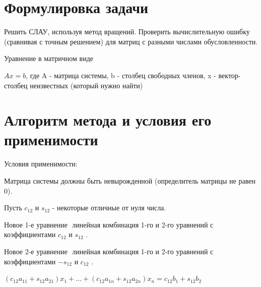 






\section{Формулировка задачи}

Решить СЛАУ, используя метод вращений. Проверить вычислительную ошибку (сравнивая с точным решением) для матриц с разными числами 
обусловленности.

Уравнение в матричном виде 

\begin{math}
	Ax=b
\end{math},
где A - матрица системы, b - столбец свободных членов, x - вектор-столбец неизвестных (который нужно найти)

\section{Алгоритм метода и условия его применимости}

Условия применимости: 

Матрица системы должны быть невырожденной (определитель матрицы не равен 0).


Пусть \begin{math}
	c_{12}
\end{math} и
 \begin{math}
 	s_{12}
 \end{math} - некоторые отличные от нуля числа.

Новое 1-­е уравнение ­ линейная комбинация 1-­го и 2-го уравнений с коэффициентами 
\begin{math}
	c_{12}
\end{math} и
\begin{math}
	s_{12}
\end{math}  .

Новое 2-­е уравнение ­ линейная комбинация 1-­го и 2-го уравнений с коэффициентами 
\begin{math}
	-s_{12}
\end{math} и
\begin{math}
	c_{12}
\end{math}  .

\begin{math}
	(c_{12}a_{11}+s_{12}a_{21})x_{1}+...+(c_{12}a_{1n}+s_{12}a_{2n})x_{n}=c_{12}b_{1}+s_{12}b_{2}
\end{math}

